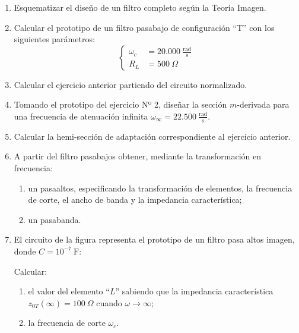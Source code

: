 \documentclass[class=article, crop=false, oneside]{standalone}
\begin{document}
\begin{enumerate}
    \item Esquematizar el diseño de un filtro completo según la Teoría Imagen.

    \item Calcular el prototipo de un filtro pasabajo de configuración ``T'' con
    los siguientes parámetros:
    \begin{equation*}
        \left\{
        \begin{aligned}
            \omega_c &= 20.000 \ \tfrac{\text{rad}}{\text{s}}\\
            R_L &= 500 \ \Omega
        \end{aligned}
        \right.
    \end{equation*}

    \item Calcular el ejercicio anterior partiendo del circuito normalizado.

    \item Tomando el prototipo del ejercicio Nº 2, diseñar la sección
    $m$-derivada para una frecuencia de atenuación infinita
    $\omega_\infty = 22.500 \ \tfrac{\text{rad}}{\text{s}}$.

    \item Calcular la hemi-sección de adaptación correspondiente al ejercicio
    anterior.

    \item A partir del filtro pasabajos obtener, mediante la transformación en
    frecuencia:
    \begin{enumerate}
        \item[a)] un pasaaltos, especificando la transformación de elementos, la
        frecuencia de corte, el ancho de banda y la impedancia característica;
        \item[b)] un pasabanda.
    \end{enumerate}

    \item El circuito de la figura representa el prototipo de un filtro pasa
    altos imagen, donde $C = 10^{-7}\ \text{F}$:
    \begin{figure}[H]
        \centering
        
    \end{figure}
    Calcular:
    \begin{enumerate}
        \item[a)] el valor del elemento ``$L$'' sabiendo que la impedancia
        característica $z_{0T}(\infty) = 100\ \Omega$ cuando $\omega\to\infty$;
        \item[b)] la frecuencia de corte $\omega_c$.
    \end{enumerate}


\end{enumerate}
\end{document}
